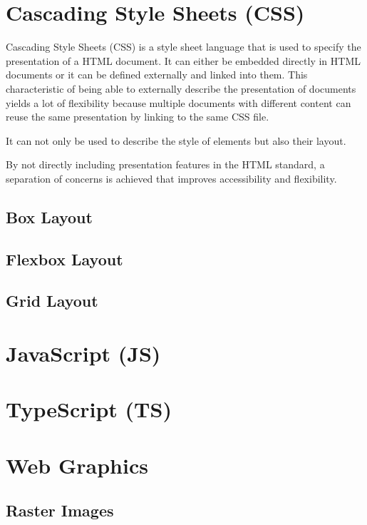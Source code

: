 \section{Cascading Style Sheets (CSS)}

Cascading Style Sheets (CSS) is a style sheet language that is used to specify the presentation of a HTML document. It can either be embedded directly in HTML documents or it can be defined externally and linked into them. This characteristic of being able to externally describe the presentation of documents yields a lot of flexibility because multiple documents with different content can reuse the same presentation by linking to the same CSS file. 


It can not only be  used to describe the style of elements but also their layout. 

By not directly including presentation features in the HTML standard, a separation of concerns is achieved that improves accessibility and flexibility.

\subsection{Box Layout}
\subsection{Flexbox Layout}
\subsection{Grid Layout}

\section{JavaScript (JS)}

\section{TypeScript (TS)}

\section{Web Graphics}

\subsection{Raster Images}


